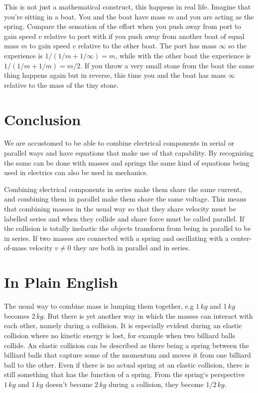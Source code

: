 \documentclass[]{elementary-physics}
\begin{document}
This is not just a mathematical construct, this happens in real life.
Imagine that you're sitting in a boat.
You and the boat have mass $m$ and you are acting as the spring.
Compare the sensation of the effort when you push away from port to gain speed $v$ relative to port with if you push away from another boat of equal mass $m$ to gain speed $v$ relative to the other boat.
The port has mass $\infty$ so the experience is $1/(1/m + 1/\infty) = m$, while with the other boat the experience is $1/(1/m + 1/m) = m/2$.
If you throw a very small stone from the boat the same thing happens again but in reverse, this time you and the boat has mass $\infty$ relative to the mass of the tiny stone.

\section{Conclusion}

We are accustomed to be able to combine electrical components in serial or parallel ways and have equations that make use of that capability.
By recognizing the same can be done with masses and springs the same kind of equations being used in electrics can also be used in mechanics.

Combining electrical components in series make them share the same current, and combining them in parallel make them share the same voltage.
This means that combining masses in the usual way so that they share velocity must be labelled series and when they collide and share force must be called parallel.
If the collision is totally inelastic the objects transform from being in parallel to be in series.
If two masses are connected with a spring and oscillating with a center-of-mass velocity $v \neq 0$ they are both in parallel and in series.

\appendix

\section{In Plain English}

The usual way to combine mass is lumping them together, e.g $1 \, kg$ and $1 \, kg$ becomes $2 \, kg$.
But there is yet another way in which the masses can interact with each other, namely during a collision.
It is especially evident during an elastic collision where no kinetic energy is lost, for example when two billiard balls collide.
An elastic collision can be described as there being a spring between the billiard balls that capture some of the momentum and moves it from one billiard ball to the other.
Even if there is no actual spring at an elastic collision, there is still something that has the function of a spring.
From the spring`s perspective $1 \, kg$ and $1 \, kg$ doesn’t become $2 \, kg$ during a collision, they become $1/2 \, kg$.
\end{document}
